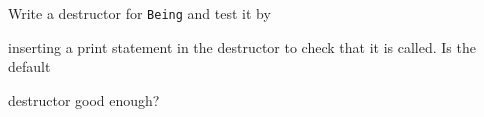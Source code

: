 Write a destructor for \texttt{Being} and test it by

inserting a print statement in the destructor to check that it is called. Is the default

destructor good enough?


